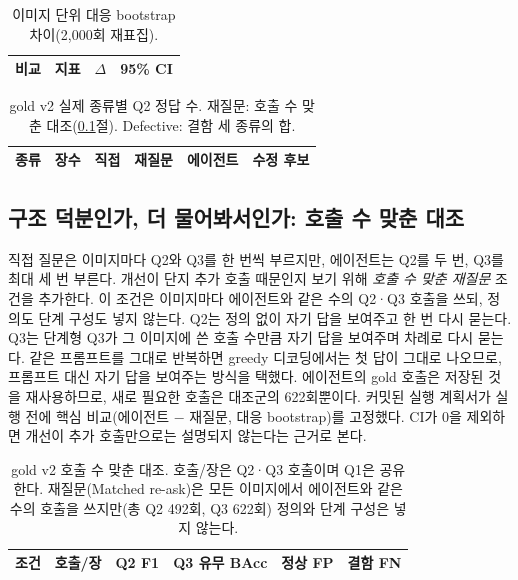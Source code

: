 \documentclass[11pt]{article}
\begin{document}
\begin{table}[t]
\centering
\caption{이미지 단위 대응 bootstrap 차이(2,000회 재표집).}
\label{tab:ci}
\begin{tabular}{llrr}
\toprule
비교 & 지표 & $\Delta$ & 95\% CI \\
\midrule

\bottomrule
\end{tabular}
\end{table}

\begin{table}[t]
\centering
\caption{gold v2 실제 종류별 Q2 정답 수. 재질문: 호출 수 맞춘 대조(\ref{sec:matched}절). Defective: 결함 세 종류의 합.}
\label{tab:perdefect}
\begin{tabular}{lrrrrr}
\toprule
종류 & 장수 & 직접 & 재질문 & 에이전트 & 수정 후보 \\
\midrule

\bottomrule
\end{tabular}
\end{table}

\subsection{구조 덕분인가, 더 물어봐서인가: 호출 수 맞춘 대조}\label{sec:matched}
직접 질문은 이미지마다 Q2와 Q3를 한 번씩 부르지만, 에이전트는 Q2를 두 번, Q3를 최대 세 번 부른다. 개선이 단지 추가 호출 때문인지 보기 위해 \emph{호출 수 맞춘 재질문} 조건을 추가한다. 이 조건은 이미지마다 에이전트와 같은 수의 Q2·Q3 호출을 쓰되, 정의도 단계 구성도 넣지 않는다. Q2는 정의 없이 자기 답을 보여주고 한 번 다시 묻는다. Q3는 단계형 Q3가 그 이미지에 쓴 호출 수만큼 자기 답을 보여주며 차례로 다시 묻는다. 같은 프롬프트를 그대로 반복하면 greedy 디코딩에서는 첫 답이 그대로 나오므로, 프롬프트 대신 자기 답을 보여주는 방식을 택했다. 에이전트의 gold 호출은 저장된 것을 재사용하므로, 새로 필요한 호출은 대조군의 622회뿐이다. 커밋된 실행 계획서가 실행 전에 핵심 비교(에이전트 $-$ 재질문, 대응 bootstrap)를 고정했다. CI가 0을 제외하면 개선이 추가 호출만으로는 설명되지 않는다는 근거로 본다.

\begin{table}[t]
\centering
\caption{gold v2 호출 수 맞춘 대조. 호출/장은 Q2·Q3 호출이며 Q1은 공유한다. 재질문(Matched re-ask)은 모든 이미지에서 에이전트와 같은 수의 호출을 쓰지만(총 Q2 492회, Q3 622회) 정의와 단계 구성은 넣지 않는다.}
\label{tab:matched}
\begin{tabular}{lrrrrr}
\toprule
조건 & 호출/장 & Q2 F1 & Q3 유무 BAcc & 정상 FP & 결함 FN \\
\midrule

\bottomrule
\end{tabular}
\end{table}
\end{document}

